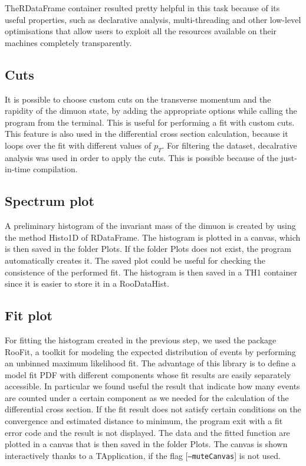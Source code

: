 \documentclass{article}
\begin{document}
 TheRDataFrame container resulted pretty helpful in this task because of its useful properties, such as declarative analysis, multi-threading and other low-level optimisations that allow users to exploit all the resources available on their machines completely transparently.
 
\subsection{Cuts}
It is possible to choose custom cuts on the transverse momentum and the rapidity of the dimuon state, by adding the appropriate options while calling the program from the terminal. This is useful for performing a fit with custom cuts. This feature is also used in the differential cross section calculation, because it loops over the fit with different values of $p_T$.
For filtering the dataset, decalrative analysis was used in order to apply the cuts. This is possible because of the just-in-time compilation.

\subsection{Spectrum plot}
A preliminary histogram of the invariant mass of the dimuon is created by using the method Histo1D of RDataFrame. The histogram is plotted in a canvas, which is then saved in the folder Plots. If the folder Plots does not exist, the program automatically creates it. The saved plot could be useful for checking the consistence of the performed fit. The histogram is then saved in a TH1 container since it is easier to store it in a RooDataHist.

\subsection{Fit plot}\label{fit}
For fitting the histogram created in the previous step, we used the package RooFit, a toolkit for modeling the expected distribution of events by performing an unbinned maximum likelihood fit. The advantage of this library is to define a model fit PDF with different components whose fit results are easily separately accessible. In particular we found useful the result that indicate how many events are counted under a certain component as we needed for the calculation of the differential cross section. 
If the fit result does not satisfy certain conditions on the convergence and estimated distance to minimum, the program exit with a fit error code and the result is not displayed.
The data and the fitted function are plotted in a canvas that is then saved in the folder Plots. The canvas is shown interactively thanks to a TApplication, if the flag [\texttt{--muteCanvas}] is not used.
\end{document}
